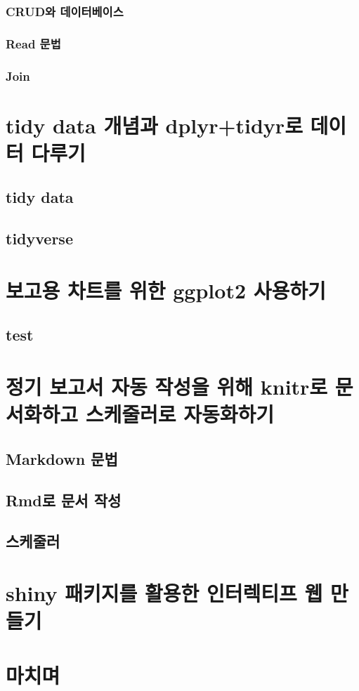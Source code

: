 \documentclass[]{book}
\theoremstyle{definition}
\theoremstyle{definition}
\theoremstyle{remark}
\begin{document}
\subsection{CRUD와 데이터베이스}\label{crud}

\subsection{Read 문법}\label{read}

\subsection{Join}\label{join}

\chapter{tidy data 개념과 dplyr+tidyr로 데이터 다루기}\label{tidyr}

\section{tidy data}\label{tidy-data}

\section{tidyverse}\label{tidyverse}

\chapter{보고용 차트를 위한 ggplot2 사용하기}\label{ggplot}

\section{test}\label{test}

\chapter{정기 보고서 자동 작성을 위해 knitr로 문서화하고 스케줄러로
자동화하기}\label{knitr}

\section{Markdown 문법}\label{markdown}

\section{Rmd로 문서 작성}\label{rmd}

\section{스케줄러}\label{scheduler}

\chapter{shiny 패키지를 활용한 인터렉티프 웹 만들기}\label{shiny}

\chapter{마치며}\label{outro}
\end{document}
